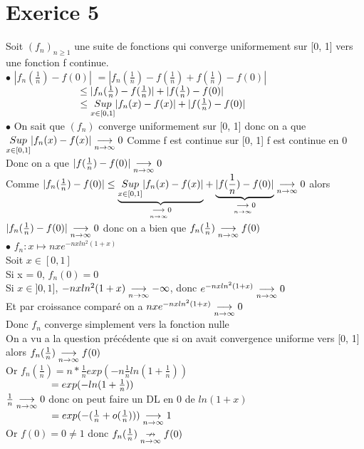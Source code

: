 \documentclass{article}
\author{Frederic Becerril}
\newcommand\tab[1][1cm]{\hspace*{#1}}
\newcommand{\mysupp}[1]{\underset{x \in #1}{Sup}}
\begin{document}
\part*{Exerice 5}

Soit $(f_n)_{n\geq 1}$ une suite de fonctions qui converge uniformement sur [0, 1] vers
une fonction f continue.\\
$\bullet$ $|f_n(\frac{1}{n}) - f(0)|$
$= |f_n(\frac{1}{n}) - f(\frac{1}{n}) + f(\frac{1}{n}) - f(0)|$\vspace{2mm}\\
$\tab[2.6cm] \leq |f_n(\frac{1}{n}) - f(\frac{1}{n})| + |f(\frac{1}{n}) - f(0)|$\vspace{2mm}\\
$\tab[2.6cm] \leq \mysupp{[0, 1]} |f_n(x) - f(x)| + |f(\frac{1}{n}) - f(0)|$\vspace{2mm}\\
$\bullet$ On sait que $(f_n)$ converge uniformement sur [0, 1] donc on a que $\mysupp{[0, 1]} |f_n(x) - f(x)| \mylim 0$
Comme f est continue sur [0, 1] f est continue en 0\\
Donc on a que $|f(\frac{1}{n}) - f(0)| \mylim 0$\\
Comme $|f_n(\frac{1}{n}) - f(0)| \leq \underset{\mylim 0}{\underbrace{\mysupp{[0, 1]} |f_n(x) - f(x)|}} + \underset{\mylim 0}{\underbrace{|f(\frac{1}{n}) - f(0)|}} \mylim 0$
alors $|f_n(\frac{1}{n}) - f(0)| \mylim 0$ donc on a bien que $f_n(\frac{1}{n}) \mylim f(0)$\\
$\bullet$ $f_n : x \longmapsto nxe^{-nxln^2(1 + x)}$\\
Soit $x \in [0, 1]$\\
Si x = 0, $f_n(0) = 0$\\
Si $x \in ]0, 1]$, $-nxln^2(1 + x) \mylim -\infty$, donc $e^{-nxln^2(1 + x)} \mylim 0$\\
Et par croissance comparé on a $nxe^{-nxln^2(1 + x)} \mylim 0$\\
Donc $f_n$ converge simplement vers la fonction nulle\\
On a vu a la question précédente que si on avait convergence uniforme vers [0, 1]\\
alors $f_n(\frac{1}{n}) \mylim f(0)$\\
Or $f_n(\frac{1}{n}) = n * \frac{1}{n} exp(-n \frac{1}{n} ln(1 + \frac{1}{n}))$\\
$\tab[1.6cm] = exp(-ln(1 + \frac{1}{n}))$\\
$\frac{1}{n} \mylim 0$ donc on peut faire un DL en 0 de $ln(1 + x)$\\
$\tab[1.6cm] = exp(-(\frac{1}{n} + o(\frac{1}{n}))) \mylim 1$\\
Or $f(0) = 0 \neq 1$ donc $f_n(\frac{1}{n}) \mynlim f(0)$
\end{document}
